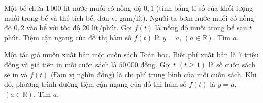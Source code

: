 \begin{bt}%
	Một bể chứa $1\,000$ lít nước muối có nồng độ $0{,}1$ (tính bằng tỉ số của khối lượng muối trong bể và thể tích bể, đơn vị gam/lít). Người ta bơm nước  muối có nồng độ $0{,}2$ vào bể với tốc độ 20 lít/phút. Gọi $f(t)$ là nồng độ muối trong bể sau $t$ phút. Tiệm cận ngang của đồ thị hàm số $f(t)$ là $y=a$, $(a \in \mathbb{R})$. Tìm $a$.
\end{bt}

\begin{bt}%
	Một tác giả muốn xuất bản  một cuốn sách Toán học. Biết phí xuất bản là 7 triệu đồng và giá tiền in mỗi cuốn sách là $50\,000$ đồng. Gọi $t$ $(t \geq 1)$ là số cuốn sách sẽ in và $f(t)$ (Đơn vị nghìn đồng) là chi phí trung bình của mỗi cuốn sách. Khi đó, phương trình đường tiệm cận ngang của đồ thị hàm số $f(t)$ là $y=a$, $(a \in \mathbb{R})$. Tìm $a$.
\end{bt}

